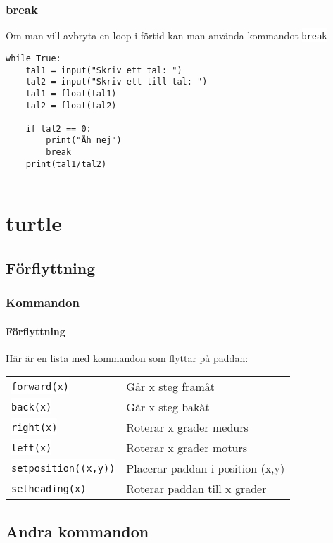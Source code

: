\documentclass[aspectratio=169]{beamer}
\newcommand{\code}[1]{\colorbox{white}{\lstinline{#1}}}
\begin{document}
\begin{frame}[fragile]
	\frametitle{break}
	
	Om man vill avbryta en loop i förtid kan man använda kommandot \code{break}
	
	\begin{lstlisting}
while True:
    tal1 = input("Skriv ett tal: ")
    tal2 = input("Skriv ett till tal: ")
    tal1 = float(tal1)
    tal2 = float(tal2)
    
    if tal2 == 0:
        print("Åh nej")
        break
    print(tal1/tal2)
    
	\end{lstlisting}
	
\end{frame}

\section{turtle}

\subsection{Förflyttning}

\begin{frame}
	\frametitle{Kommandon}
	\framesubtitle{Förflyttning}
	
	Här är en lista med kommandon som flyttar på paddan:
	
	\begin{tabular}{ll}
		\code{forward(x)} & Går x steg framåt\\
		\code{back(x)} & Går x steg bakåt\\
		\code{right(x)} & Roterar x grader medurs\\
		\code{left(x)} & Roterar x grader moturs\\
		\code{setposition((x,y))} & Placerar paddan i position (x,y)\\
		\code{setheading(x)} & Roterar paddan till x grader
	\end{tabular}
	
\end{frame}

\subsection{Andra kommandon}
\end{document}
